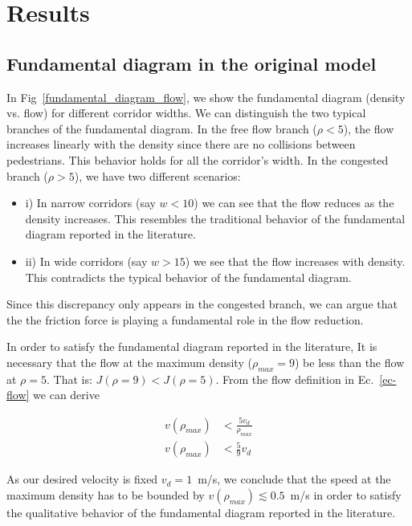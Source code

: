 \section{\label{results}Results}

\subsection{Fundamental diagram in the original model}

In Fig~\ref{fundamental_diagram_flow}, we show the fundamental diagram (density vs. flow) for different corridor widths. We can distinguish the two typical branches of the fundamental diagram. In the free flow branch ($\rho < 5$), the flow increases linearly with the density since there are no collisions between pedestrians. This behavior holds for all the corridor's width. In the congested branch ($\rho > 5$), we have two different scenarios:


\begin{itemize}
\item i) In narrow corridors (say $w < 10$) we can see that the flow reduces as the density increases. This resembles the traditional behavior of the fundamental diagram reported in the literature. 
\item ii) In wide corridors (say $w > 15$) we see that the flow increases with density. This contradicts the typical behavior of the fundamental diagram.   
\end{itemize}

Since this discrepancy only appears in the congested branch, we can argue that the the friction force is playing a fundamental role in the flow reduction.  

In order to satisfy the fundamental diagram reported in the literature, It is necessary that the flow at the maximum density ($\rho_{max} = 9$) be less than the flow at $\rho = 5$. That is:  $J(\rho = 9) < J(\rho = 5)$. From the flow definition in Ec.~\ref{ec-flow} we can derive

\begin{align*} 
v(\rho_{max}) &< \frac{5v_d}{\rho_{max}} \\
v(\rho_{max}) &< \frac{5}{9} v_d
\end{align*}


As our desired velocity is fixed $v_d = 1$~m/s, we conclude that the speed at the maximum density has to be bounded by $v(\rho_{max}) \lesssim 	0.5$~m/s in order to satisfy the qualitative behavior of the fundamental diagram reported in the literature.\\

